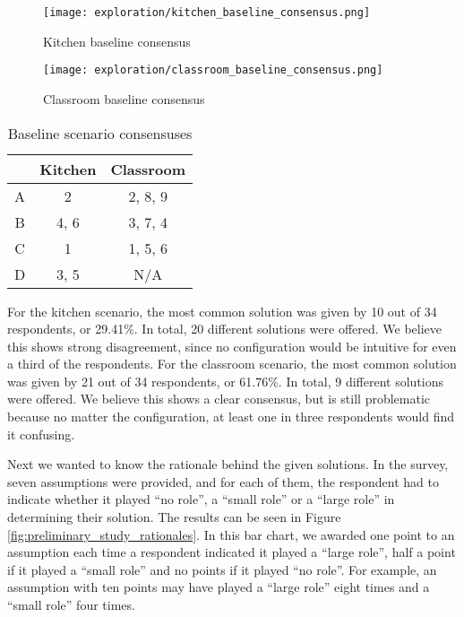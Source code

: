\begin{figure}
    \centering
    \texttt{[image: exploration/kitchen\_baseline\_consensus.png]}
    \caption{Kitchen baseline consensus}
    \label{fig:preliminary_study_kitchen_baseline_consensus}
\end{figure}

\begin{figure}
    \centering
    \texttt{[image: exploration/classroom\_baseline\_consensus.png]}
    \caption{Classroom baseline consensus}
    \label{fig:preliminary_study_classroom_baseline_consensus}
\end{figure}

\begin{table}[h!]
    \centering
    \begin{tabular}{|c|c|c|} 
    \hline
      & Kitchen & Classroom \\
    \hline
    A & 2       & 2, 8, 9   \\
    B & 4, 6    & 3, 7, 4   \\
    C & 1       & 1, 5, 6   \\
    D & 3, 5    & N/A       \\
    \hline
\end{tabular}
\caption{Baseline scenario consensuses}
\label{table:preliminary_study_consensus}
\end{table}

For the kitchen scenario, the most common solution was given by 10 out of 34 respondents, or 29.41\%. In total, 20 different solutions were offered. We believe this shows strong disagreement, since no configuration would be intuitive for even a third of the respondents. For the classroom scenario, the most common solution was given by 21 out of 34 respondents, or 61.76\%. In total, 9 different solutions were offered. We believe this shows a clear consensus, but is still problematic because no matter the configuration, at least one in three respondents would find it confusing.

Next we wanted to know the rationale behind the given solutions. In the survey, seven assumptions were provided, and for each of them, the respondent had to indicate whether it played ``no role'', a ``small role'' or a ``large role'' in determining their solution. The results can be seen in Figure \ref{fig:preliminary_study_rationales}. In this bar chart, we awarded one point to an assumption each time a respondent indicated it played a ``large role'', half a point if it played a ``small role'' and no points if it played ``no role''. For example, an assumption with ten points may have played a ``large role'' eight times and a ``small role'' four times.

